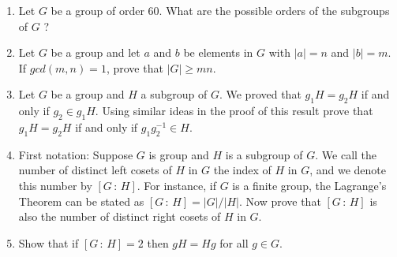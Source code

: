\documentclass[11pt]{article}
\theoremstyle{definition}  %
\begin{document}

\begin{enumerate}

\item Let $G$ be a group of order $60$. What are the possible orders of the subgroups of $G$ ?
\item Let $G$ be a group and let $a$ and $b$ be elements in $G$ with $|a| = n$ and $|b| = m$. If $gcd(m,n) = 1$, prove that $|G| \geq mn$. 
\item Let $G$ be a group and $H$ a subgroup of $G$. We proved that $g_1H = g_2H$ if and only if $g_2 \in g_1H$. Using similar ideas in the
  proof of this result prove that $g_1H=g_2H$ if and only if $g_1g_2^{-1} \in H$. 
\item First notation: Suppose $G$ is group and $H$ is a subgroup of $G$. We call the number of distinct left cosets of $H$ in $G$ the index of $H$ in $G$,
  and we denote this number by $[G \, : \, H]$. For instance, if $G$ is a finite group, the Lagrange's Theorem can be stated as $[G \, : \, H] = |G| / |H|$.
  Now prove that $[G \, : \, H]$ is also the number of distinct right cosets of $H$ in $G$.
 \item Show that if $[G \, : \, H] = 2$ then $gH = Hg$ for all $g \in G$. 
\end{enumerate}
\end{document}
